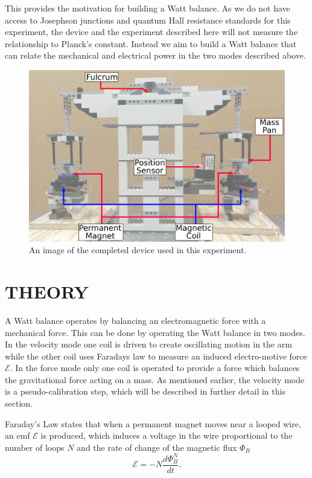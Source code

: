\documentclass[aps,prstab,reprint,12pt]{revtex4-1}
\begin{document}
This provides the motivation for building a Watt balance. As we do not have access to Josephson junctions and quantum Hall resistance standards for this experiment, the device and the experiment described here will not measure the relationship to Planck's constant. Instead we aim to build a Watt balance that can relate the mechanical and electrical power in the two modes described above.

\begin{figure}
    \centering
    \includegraphics[width=0.95\linewidth]{figs/watt_balance.png}
    \caption{An image of the completed device used in this experiment.}
    \label{fig:device_image}
\end{figure}


\section{THEORY}\label{s:theory}

A Watt balance operates by balancing an electromagnetic force with a mechanical force. This can be done by operating the Watt balance in two modes. In the velocity mode one coil is driven to create oscillating motion in the arm while the other coil uses Faradays law to measure an induced electro-motive force $\mathscr{E}$. In the force mode only one coil is operated to provide a force which balances the gravitational force acting on a mass. As mentioned earlier, the velocity mode is a pseudo-calibration step, which will be described in further detail in this section.

Faraday's Law states that when a permanent magnet moves near a looped wire, an emf $\mathscr{E}$ is produced, which induces a voltage in the wire proportional to the number of loops $N$ and the rate of change of the magnetic flux $\Phi_B$
\begin{equation}\label{eq:Faraday}
\mathscr{E} =-N\frac{d \Phi_B^N}{dt}.
\end{equation}
\end{document}
